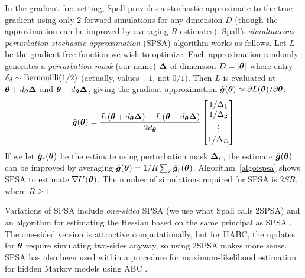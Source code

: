 \documentclass[]{article}
\begin{document}
In the gradient-free setting, Spall \cite{spall1992multivariate, spall2000adaptive} provides a stochastic approximate to the true gradient using only $2$ forward simulations for any dimension $D$ (though the approximation can be improved by averaging $R$ estimates).  Spall's {\em simultaneous perturbation stochastic approximation} (SPSA) algorithm works as follows. Let $L$ be the gradient-free function we wish to optimize.  Each approximation randomly generates a {\em perturbation mask} (our name) ${\bm \Delta}$ of dimension $D=|{\bm \theta}|$ where entry $\delta_d \sim \text{Bernouilli}(1/2)$ (actually, values $\pm 1$, not $0/1$).  Then $L$ is evaluated at ${\bm \theta}+d_{{\bm \theta}} {\bm \Delta}$ and ${\bm \theta}-d_{{\bm \theta}} {\bm \Delta}$, giving the gradient approximation $\hat{{\bm g }}({\bm \theta}) \approx \partial L({\bm \theta}) / \partial {\bm \theta}$:
\begin{equation}
  \hat{{\bm g }}({\bm \theta}) = \frac{L\left({\bm \theta}+d_{{\bm \theta}} {\bm \Delta}\right) - L\left({\bm \theta}-d_{{\bm \theta}} {\bm \Delta}\right)}{2 d_{{\bm \theta}}} \begin{bmatrix} 
                                   1/\Delta_1 \\
                                   1/\Delta_2 \\
                                   \vdots \\
                                   1/\Delta_D \\
                                \end{bmatrix}
\end{equation}
If we let $\hat{{\bm g }}_r({\bm \theta})$ be the estimate using perturbation mask ${\bm \Delta}_r$, the estimate $\hat{{\bm g }}({\bm \theta})$ can be improved by averaging $\hat{{\bm g }}({\bm \theta}) = 1/R \sum_r \hat{{\bm g }}_r({\bm \theta})$.
Algorithm~\ref{algo:spsa} shows SPSA to estimate $\nabla U({\bm \theta})$.  The number of simulations required for SPSA is $2 S R$, where $R \geq 1$.


Variations of SPSA include {\em one-sided} SPSA \cite{spall2000adaptive} (we use what Spall calls 2SPSA) and an algorithm for estimating the Hessian based on the same principal as SPSA \cite{spall2005monte}.   The one-sided version is attractive computationally, but for HABC, the updates for ${\bm \theta}$ require simulating two-sides anyway, so using 2SPSA makes more sense.  SPSA has also been used within a procedure for maximum-likelihood estimation for hidden Markov models using ABC \cite{Ehrlich2013}.
\end{document}
